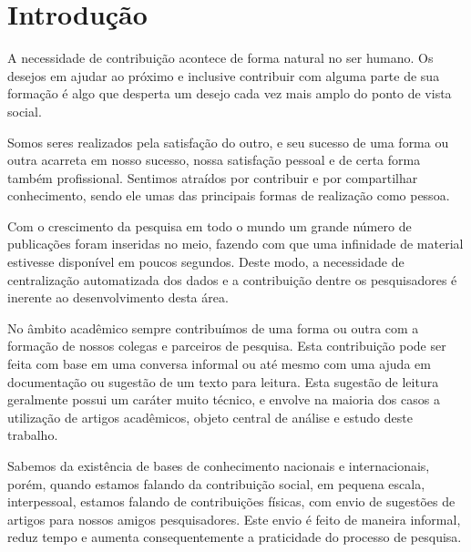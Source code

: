 
\chapter{Introdução}
\label{cha:introduction}


A necessidade de contribuição acontece de forma natural no ser humano. Os desejos em ajudar ao próximo e inclusive contribuir com alguma parte de sua formação é algo que desperta um desejo cada vez mais amplo do ponto de vista social.

Somos seres realizados pela satisfação do outro, e seu sucesso de uma forma ou outra acarreta em nosso sucesso, nossa satisfação pessoal e de certa forma também profissional. Sentimos atraídos por contribuir e por compartilhar conhecimento, sendo ele umas das principais formas de realização como pessoa.

Com o crescimento da pesquisa em todo o mundo um grande número de publicações foram inseridas no meio, fazendo com que uma infinidade de material estivesse disponível em poucos segundos. Deste modo, a necessidade de centralização automatizada dos dados e a contribuição dentre os pesquisadores é inerente ao desenvolvimento desta área. 

No âmbito acadêmico sempre contribuímos de uma forma ou outra com a formação de nossos colegas e parceiros de pesquisa. Esta contribuição pode ser feita com base em uma conversa informal ou até mesmo com uma ajuda em documentação ou sugestão de um texto para leitura. Esta sugestão de leitura geralmente possui um caráter muito técnico, e envolve na maioria dos casos a utilização de artigos acadêmicos, objeto central de análise e estudo deste trabalho.

\begin{textedited}
Sabemos da existência de bases de conhecimento nacionais e internacionais, porém, quando estamos falando da contribuição social, em pequena escala, interpessoal, estamos falando de contribuições físicas, com envio de sugestões de artigos para nossos amigos pesquisadores. Este envio é feito de maneira informal, reduz tempo e aumenta consequentemente a praticidade do processo de pesquisa.
\end{textedited}

